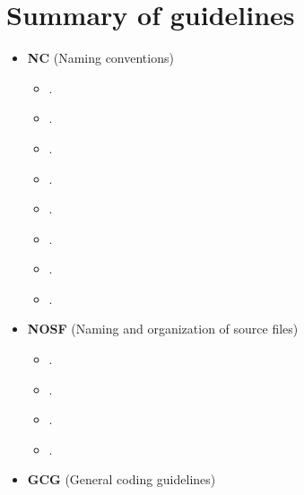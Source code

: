 %
\section{Summary of guidelines}
\label{sec:summary_guidelines}
%

\begin{itemize}

\item\textbf{NC} (Naming conventions)

  \setcounter{Thyra_NC_counter}{0}

  \begin{itemize}
  {}\item\NCClassNames.
  {}\item\NCNamespaceNames.
  {}\item\NCEnumNames.
  {}\item\NCObjectNames.
  {}\item\NCDataMemberNames.
  {}\item\NCFunctionNames.
  {}\item\NCBaseDefaultClassNames.
  {}\item\NCConstNonconstAccessFunctionName.
  \end{itemize}

\item\textbf{NOSF} (Naming and organization of source files)

  \setcounter{Thyra_NOSF_counter}{0}

  \begin{itemize}
  {}\item\NOSFFileExtension.
  {}\item\NOSFClassFiles.
  {}\item\NOSFIncludeGuards.
  {}\item\NOSFTemplateFiles.
  \end{itemize}

\item\textbf{GCG} (General coding guidelines)

  \setcounter{Thyra_GCG_counter}{0}


\end{itemize}
